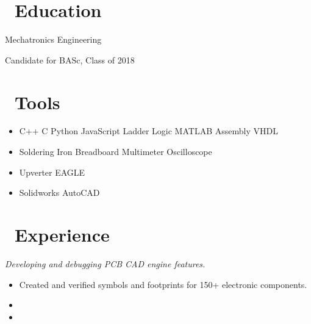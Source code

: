 \documentclass{resume}
\begin{document}


 
\section{\faGraduationCap\ Education}
Mechatronics Engineering\par
Candidate for BASc, Class of 2018

\section{\faCogs\ Tools}
\begin{itemize}[parsep=0.5ex]
  \item %
  C++\textperiodcentered 
  C\textperiodcentered 
  Python\textperiodcentered 
  JavaScript\textperiodcentered
  Ladder Logic\textperiodcentered
  MATLAB\textperiodcentered
  Assembly\textperiodcentered
  VHDL
  \item %
  Soldering Iron\textperiodcentered
  Breadboard\textperiodcentered
  Multimeter\textperiodcentered
  Oscilloscope
  \item %
  Upverter\textperiodcentered
  EAGLE
  \item %
  Solidworks\textperiodcentered
  AutoCAD
\end{itemize}

\section{\faUsers\ Experience}
\textit{Developing and debugging PCB CAD engine features.}
\begin{itemize}
  \item Created and verified symbols and footprints for 150+ electronic components.
  \item 
  \item 
\end{itemize}
\end{document}
